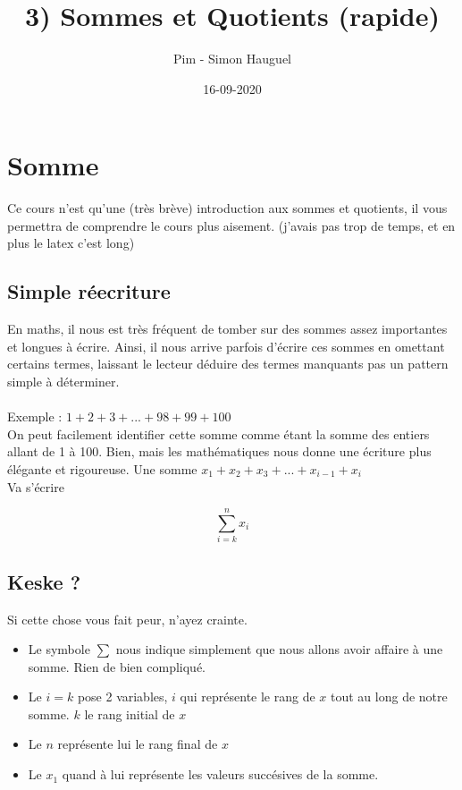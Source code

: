 \documentclass{article}
\title{3) Sommes et Quotients (rapide)}
\author{Pim - Simon Hauguel}
\date{16-09-2020}
\begin{document}
\maketitle

\section{Somme}
Ce cours n'est qu'une (très brève) introduction aux sommes et quotients, il vous permettra de comprendre le cours plus aisement. (j'avais pas trop de temps, et en plus le latex c'est long)
\subsection{Simple réecriture}

En maths, il nous est très fréquent de tomber sur des sommes assez importantes et longues à écrire. Ainsi, il nous arrive parfois d'écrire ces sommes en omettant certains termes, laissant le lecteur déduire des termes manquants pas un pattern simple à déterminer.\\\\
Exemple : $1 + 2 + 3 + ... + 98 + 99 + 100$\\
On peut facilement identifier cette somme comme étant la somme des entiers allant de 1 à 100.
Bien, mais les mathématiques nous donne une écriture plus élégante et rigoureuse.
Une somme $x_{1} + x_{2} + x_{3}+ ... + x_{i-1} + x_{i}$\\
Va s'écrire

\begin{center}

  \[\sum_{i=k}^n x_{i}\]

\end{center}

\subsection{Keske ?}

Si cette chose vous fait peur, n'ayez crainte.\\
\begin{itemize}
  \item Le symbole $\sum$ nous indique simplement que nous allons avoir affaire à une somme. Rien de bien compliqué.
  \item Le $i=k$ pose 2 variables, $i$ qui représente le rang de $x$ tout au long de notre somme. $k$ le rang initial de $x$
  \item Le $n$ représente lui le rang final de $x$
  \item Le $x_{1}$ quand à lui représente les valeurs succésives de la somme.
\end{itemize}
\end{document}
